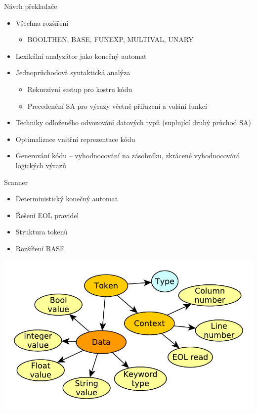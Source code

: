 \documentclass[10pt,xcolor=pdflatex,hyperref={unicode,hidelinks}]{beamer}
\begin{document}
\begin{frame}{Návrh překladače}
    \begin{itemize}       
        \item Všechna rozšíření
        \begin{itemize}
            \item BOOLTHEN, BASE, FUNEXP, MULTIVAL, UNARY
        \end{itemize}
        \item Lexikální analyzátor jako konečný automat
        \item Jednoprůchodová syntaktická analýza
        \begin{itemize}
            \item Rekurzivní sestup pro kostru kódu
            \item Precedenční SA pro výrazy včetně přiřazení a volání funkcí
        \end{itemize}
        \item Techniky odloženého odvozování datových typů (suplující druhý průchod SA)
        \item Optimalizace vnitřní reprezentace kódu
        \item Generování kódu – vyhodnocování na zásobníku, zkrácené vyhodnocování logických výrazů
    \end{itemize}
\end{frame}

\begin{frame}{Scanner}
    \begin{itemize}
        \item Deterministický konečný automat
        \item Řešení EOL pravidel
        \item Struktura tokenů
        \item Rozšíření BASE
    \end{itemize}        
    
    \flushright\includegraphics[height=0.6\textheight]{img/pres_token_graph.pdf}

\end{frame}
\end{document}
